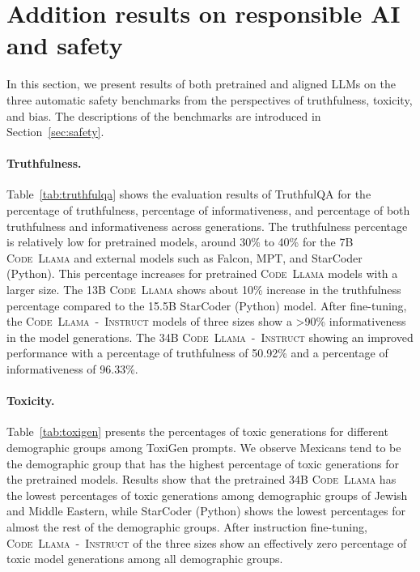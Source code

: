 \documentclass[10pt]{article}
\newcommand{\model}{\textsc{Code~Llama}\xspace}
\newcommand{\instmodel}{\textsc{Code~Llama~-~Instruct}\xspace}
\begin{document}
\section{Addition results on responsible AI and safety}
\label{appendix:safety}

In this section, we present results of both pretrained and aligned LLMs on the three automatic safety benchmarks from the perspectives of truthfulness, toxicity, and bias. The descriptions of the benchmarks are introduced in Section~\ref{sec:safety}. 


\paragraph{Truthfulness.} Table~\ref{tab:truthfulqa} shows the evaluation results of TruthfulQA for the percentage of truthfulness, percentage of informativeness, and percentage of both truthfulness and informativeness across generations. 
The truthfulness percentage is relatively low for pretrained models, around 30\% to 40\% for the 7B \model and external models such as Falcon, MPT, and StarCoder (Python). 
This percentage increases for pretrained \model models with a larger size. 
The 13B \model shows about 10\% increase in the truthfulness percentage compared to the 15.5B StarCoder (Python) model. 
After fine-tuning, the \instmodel models of three sizes show a >90\% informativeness in the model generations. 
The 34B \instmodel showing an improved performance with a percentage of truthfulness of 50.92\% and a percentage of informativeness of 96.33\%. 


\paragraph{Toxicity.} Table~\ref{tab:toxigen} presents the percentages of toxic generations for different demographic groups among ToxiGen prompts. 
We observe Mexicans tend to be the demographic group that has the highest percentage of toxic generations for the pretrained models. 
Results show that the pretrained 34B \model has the lowest percentages of toxic generations among demographic groups of Jewish and Middle Eastern, while StarCoder (Python) shows the lowest percentages for almost the rest of the demographic groups. 
After instruction fine-tuning, \instmodel of the three sizes show an effectively zero percentage of toxic model generations among all demographic groups. 
\end{document}
